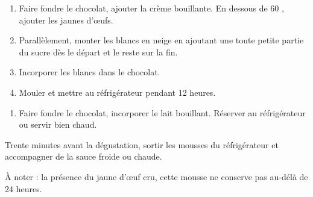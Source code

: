

\begin{ingredients}
\end{ingredients}


\begin{recipe}
  \begin{enumerate}

  \item Faire fondre le chocolat, ajouter la crème bouillante.  En
    dessous de 60 \C, ajouter les jaunes d'œufs.

  \item Parallèlement, monter les blancs en neige en ajoutant une
    toute petite partie du sucre dès le départ et le reste sur la fin.

  \item Incorporer les blancs dans le chocolat.

  \item Mouler et mettre au réfrigérateur pendant 12 heures.

  \end{enumerate}
\end{recipe}


\begin{ingredients}
\end{ingredients}

\begin{recipe}
  \begin{enumerate}

  \item Faire fondre le chocolat, incorporer le lait bouillant.
    Réserver au réfrigérateur ou servir bien chaud.

  \end{enumerate}
\end{recipe}


Trente minutes avant la dégustation, sortir les mousses du
réfrigérateur et accompagner de la sauce froide ou chaude.

À noter : la présence du jaune d'œuf cru, cette mousse ne conserve
pas au-délà de 24 heures.

